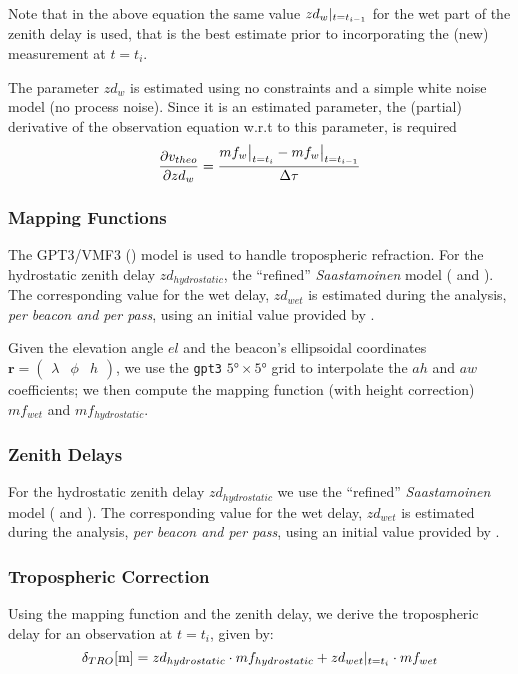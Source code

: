 Note that in the above equation the same value $zd_{w}\at{t=t_{i-1}}$ 
for the wet part of the zenith delay is used, that is the best estimate prior to 
incorporating the (new) measurement at $t=t_i$.

The parameter $zd_{w}$ is estimated using no constraints and a simple white 
noise model (no process noise). Since it is an estimated parameter, 
the (partial) derivative of the observation equation w.r.t to this parameter, 
is required
\begin{equation}\label{eq:partials-zwd}
  \frac{\partial v_{theo}}{\partial zd_{w}} = \frac{mf_{w}\at[\big]{t=t_i} 
    - mf_{w}\at[\big]{t=t_{i-1}}}{\Delta \tau}
\end{equation}

\iffalse
\subsubsection{Mapping Functions}
The GPT3/VMF3 (\cite{Landskron2018}) model is used to handle tropospheric refraction. 
For the hydrostatic zenith delay $zd_{hydrostatic}$, the ``refined'' 
\emph{Saastamoinen} model (\cite{Davis1985} and \cite{Saastamoinen1972}). 
The corresponding value for the wet delay, $zd_{wet}$ is estimated during the 
analysis, \emph{per beacon and per pass}, using an initial value provided by 
\cite{Askne1987}.

Given the elevation angle $el$ and the beacon's ellipsoidal coordinates 
$\bm{r}=\begin{pmatrix} \lambda & \phi & h\end{pmatrix}$, we use the \texttt{gpt3} 
$\ang{5} \times \ang{5}$ grid to interpolate the $ah$ and $aw$ coefficients; 
we then compute the mapping function (with height correction) $mf_{wet}$ and 
$mf_{hydrostatic}$.

\subsubsection{Zenith Delays}
For the hydrostatic zenith delay $zd_{hydrostatic}$ we use the ``refined'' 
\emph{Saastamoinen} model (\cite{Davis1985} and \cite{Saastamoinen1972}). 
The corresponding value for the wet delay, $zd_{wet}$ is estimated during the 
analysis, \emph{per beacon and per pass}, using an initial value provided by 
\cite{Askne1987}.

\subsubsection{Tropospheric Correction}
Using the mapping function and the zenith delay, we derive the tropospheric 
delay for an observation at $t=t_i$, given by:
\begin{equation}
  \delta _{TRO} [\si{\m}] = zd_{hydrostatic} \cdot mf_{hydrostatic} + zd_{wet}\at{t=t_i} \cdot mf_{wet}
  \label{eq:tropo-delay}
\end{equation}

